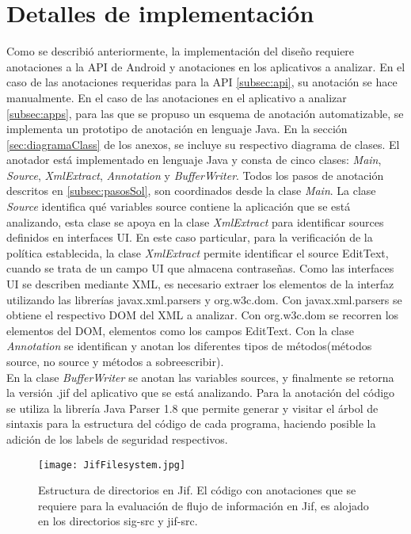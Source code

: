 \section{Detalles de implementación}
\label{sec:detallesImp}
Como se describió anteriormente, la implementación del diseño requiere
anotaciones a la API de Android y anotaciones en los aplicativos a
analizar.\newline 
En el caso de las anotaciones requeridas para la API \ref{subsec:api},
su anotación se hace manualmente.\newline 
En el caso de las anotaciones en el
aplicativo a analizar \ref{subsec:apps}, para las que se propuso un esquema de anotación automatizable, se implementa un
prototipo de anotación en lenguaje Java. En la sección \ref{sec:diagramaClass}
de los anexos, se incluye su respectivo diagrama de clases.\newline 
El anotador está implementado en lenguaje Java y consta de cinco clases:
\emph{Main}, \emph{Source}, \emph{XmlExtract}, \emph{Annotation} y
\emph{BufferWriter}.\newline 
Todos los pasos de anotación descritos en
\ref{subsec:pasosSol}, son coordinados desde la clase \emph{Main}.\newline
La clase \emph{Source} identifica qué variables source contiene la aplicación que se
está analizando, esta clase se apoya en la clase \emph{XmlExtract} para identificar
sources definidos en interfaces UI. En este caso particular, para la
verificación de la política establecida, la clase \emph{XmlExtract} permite identificar
el source EditText, cuando se trata de un campo UI que almacena
contraseñas.\newline 
Como las interfaces UI se describen mediante XML, es
necesario extraer los elementos de la interfaz utilizando las librerías javax.xml.parsers y
org.w3c.dom. Con javax.xml.parsers se obtiene el respectivo DOM del XML a
analizar. Con org.w3c.dom se recorren los elementos del DOM, elementos como los
campos EditText.\newline 
Con la clase \emph{Annotation}  se identifican y anotan los diferentes tipos de
métodos(métodos source, no source y métodos a sobreescribir).\\
En la clase \emph{BufferWriter} se anotan las variables sources, y finalmente
se retorna la versión .jif del aplicativo que se está analizando.\newline 
Para la anotación del código se utiliza la librería Java Parser 1.8  que permite
generar y visitar el árbol de sintaxis para la estructura del código de cada
programa, haciendo posible la adición de los labels de seguridad respectivos.\\
\label{subsec:anotador}
\begin{figure}[t!]
	\begin{center}
	\texttt{[image: JifFilesystem.jpg]}
	\end{center}
	\caption{Estructura de directorios en Jif.
	El código con anotaciones que se requiere para la evaluación de flujo de
	información en Jif, es alojado en los directorios sig-src y jif-src.}
	\label{fig:jifFilesystem} 
\end{figure}

